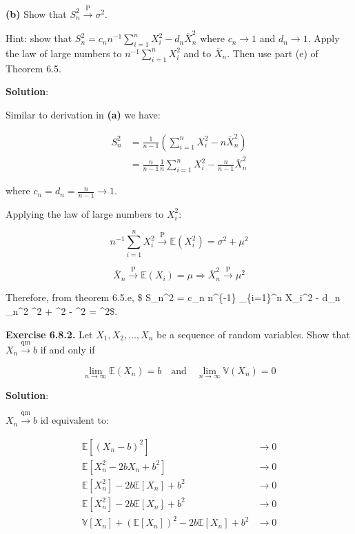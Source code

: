 \textbf{(b)} Show that \(S_n^2 \xrightarrow{\text{P}} \sigma^2\).

Hint: show that
\(S_n^2 = c_n n^{-1} \sum_{i=1}^n X_i^2 - d_n \overline{X}_n^2\) where
\(c_n \rightarrow 1\) and \(d_n \rightarrow 1\). Apply the law of large
numbers to \(n^{-1}\sum_{i=1}^n X_i^2\) and to \(\overline{X}_n\). Then
use part (e) of Theorem 6.5.

\textbf{Solution}:

Similar to derivation in \textbf{(a)} we have:

\begin{align}
S_n^2 & = \frac {1}{n-1} \left( \sum_{i=1}^n X_i^2 - n \overline{X}_n^2 \right) \\
& = \frac{n}{n-1} \frac{1}{n} \sum_{i=1}^n X_i^2 - \frac{n}{n-1} \overline{X}_n^2 
\end{align}

where \(c_n = d_n = \frac{n}{n-1} \rightarrow 1\).

Applying the law of large numbers to \(X_i^2\):

\[ n^{-1} \sum_{i=1}^n X_i^2 \xrightarrow{\text{P}} \mathbb{E}(X_i^2) = \sigma^2 + \mu^2\]

\[ \overline{X}_n \xrightarrow{\text{P}} \mathbb{E}(X_i) = \mu \Rightarrow \overline{X}_n^2 \xrightarrow{\text{P}} \mu^2 \]

Therefore, from theorem 6.5.e, \$ S\_n\^{}2 = c\_n n\^{}\{-1\}
\sum\_\{i=1\}\^{}n X\_i\^{}2 - d\_n \_n\^{}2
 \sigma\^{}2 + \mu\^{}2 - \mu\^{}2 =
\sigma\^{}2\$.

\textbf{Exercise 6.8.2.} Let \(X_1, X_2, \dots, X_n\) be a sequence of
random variables. Show that \(X_n \xrightarrow{\text{qm}} b\) if and
only if

\[
\begin{equation}
\lim_{n \rightarrow \infty} \mathbb{E}(X_n) = b
\quad\mathrm{and}\quad 
\lim_{n \rightarrow \infty} \mathbb{V}(X_n) = 0
\end{equation}
\]

\textbf{Solution}:

\(X_n \xrightarrow{\text{qm}} b\) id equivalent to:

\begin{align}
\mathbb{E}[(X_n - b)^2]           & \rightarrow 0 \\
\mathbb{E}[X_n^2 - 2b X_n + b^2]  & \rightarrow 0 \\
\mathbb{E}[X_n^2] - 2b \mathbb{E}[X_n] + b^2 & \rightarrow 0 \\
\mathbb{E}[X_n^2] - 2b \mathbb{E}[X_n] + b^2 & \rightarrow 0 \\
\mathbb{V}[X_n] + (\mathbb{E}[X_n])^2 - 2b \mathbb{E}[X_n] + b^2  & \rightarrow 0
\end{align}


